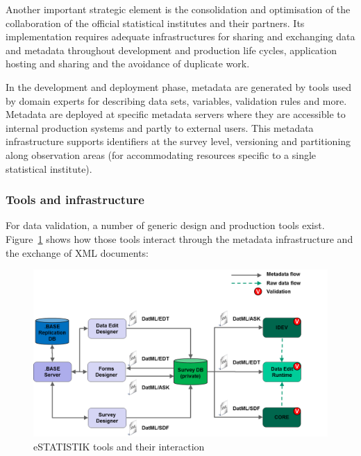 Another important strategic element is the consolidation and optimisation of the collaboration of the official statistical institutes and their partners. Its implementation requires adequate infrastructures for sharing and exchanging data and metadata throughout development and production life cycles, application hosting and sharing and the avoidance of duplicate work.

In the development and deployment phase, metadata are generated by tools used by domain experts for describing data sets, variables, validation rules and more. Metadata are deployed at specific metadata servers where they are accessible to internal production systems and partly to external users. This metadata infrastructure supports identifiers at the survey level, versioning and partitioning along observation areas (for accommodating resources specific to a single statistical institute). 

\subsubsection{Tools and infrastructure}


For data validation, a number of generic design and production tools exist. Figure~\ref{estattools} shows how those tools interact through the metadata infrastructure and the exchange of XML documents:

\begin{figure}[!ht]
\begin{center}
\includegraphics[scale=0.5]{fig/estattools.png} 
\end{center}
\caption{eSTATISTIK tools and their interaction}
\label{estattools}
\end{figure}

